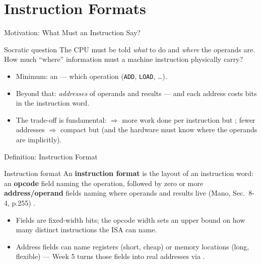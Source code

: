 \documentclass[aspectratio=169]{beamer}
\begin{document}
\section{Instruction Formats}


\begin{frame}{Motivation: What Must an Instruction Say?}
  \begin{block}{Socratic question}
    The CPU must be told \emph{what} to do and \emph{where} the operands are.
    How much ``where'' information must a machine instruction physically carry?
  \end{block}
  \begin{itemize}
    \item Minimum: an  --- which operation (\texttt{ADD},
      \texttt{LOAD}, \dots).
    \item Beyond that: \emph{addresses} of operands and results --- and each
      address costs bits in the instruction word.
    \item The trade-off is fundamental: 
      $\Rightarrow$ more work done per instruction but ;
      fewer addresses $\Rightarrow$ compact but  (and the
      hardware must know where the operands are implicitly).
  \end{itemize}
\end{frame}

\begin{frame}{Definition: Instruction Format}
  \begin{block}{Instruction format}
    An \textbf{instruction format} is the layout of an instruction word: an
    \textbf{opcode} field naming the operation, followed by zero or more
    \textbf{address/operand} fields naming where operands and results live
    (Mano, Sec.~8-4, p.255) \cite{Mano1993_computer_system_architecture}.
  \end{block}
  \begin{itemize}
    \item Fields are fixed-width bits; the opcode width sets an upper bound on
      how many distinct instructions the ISA can name.
    \item Address fields can name registers (short, cheap) or memory locations
      (long, flexible) --- Week 5 turns those fields into real addresses via
      .
  \end{itemize}
\end{frame}
\end{document}
